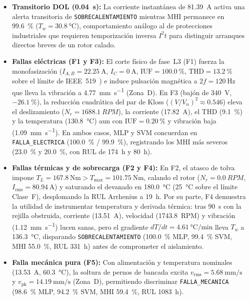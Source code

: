 \begin{itemize}\setlength{\itemsep}{2pt}\setlength{\topsep}{2pt}
\item \textbf{Transitorio DOL (\qty{0.04}{\second}):} La corriente instantánea de \qty{81.39}{\ampere} activa una alerta transitoria de \texttt{SOBRECALENTAMIENTO} mientras MHI permanece en \qty{99.6}{\percent} ($T_w=\qty{30.8}{\celsius}$), comportamiento análogo al de protecciones industriales que requieren temporización inversa $I^2t$ para distinguir arranques directos breves de un rotor calado.
\item \textbf{Fallas eléctricas (F1 y F3):} El corte físico de fase~L3 (F1) fuerza la monofasización ($I_{A,B}=\qty{22.25}{\ampere}$, $I_C=\qty{0}{\ampere}$, $\text{IUF}=\qty{100.0}{\percent}$, $\text{THD}=\qty{13.2}{\percent}$ sobre el límite de IEEE~519~\cite{IEEE519}) e induce pulsación magnética a $2f=\qty{120}{\hertz}$ que lleva la vibración a \qty{4.77}{\milli\meter\per\second} (Zona~D). En F3 (bajón de \qty{340}{\volt}, $-\qty{26.1}{\percent}$), la reducción cuadrática del par de Kloss ($(V/V_n)^2 \approx 0.546$) eleva el deslizamiento ($N_r=\qty{1688.1}{RPM}$), la corriente (\qty{17.82}{\ampere}), el THD (\qty{9.1}{\percent}) y la temperatura (\qty{130.8}{\celsius}) aun con $\text{IUF}=\qty{0.20}{\percent}$ y vibración baja (\qty{1.09}{\milli\meter\per\second}). En ambos casos, MLP y SVM concuerdan en \texttt{FALLA\_ELECTRICA} (\qty{100.0}{\percent} / \qty{99.9}{\percent}), registrando los MHI más severos (\qty{23.0}{\percent} y \qty{20.0}{\percent}, con RUL de \qty{174}{\hour} y \qty{80}{\hour}).
\item \textbf{Fallas térmicas y de sobrecarga (F2 y F4):} En F2, el atasco de tolva impone $T_L=\qty{167.8}{\newton\meter} > T_{\max}=\qty{101.75}{\newton\meter}$, calando el rotor ($N_r=\qty{0.0}{RPM}$, $I_{\text{rms}}=\qty{80.94}{\ampere}$) y saturando el devanado en \qty{180.0}{\celsius} (\qty{25}{\celsius} sobre el límite Clase~F), desplomando la RUL Arrhenius a \qty{19}{\hour}. Por su parte, F4 demuestra la utilidad de instrumentar temperatura y derivada térmica: tras \qty{90}{\second} con la rejilla obstruida, corriente (\qty{13.51}{\ampere}), velocidad (\qty{1743.8}{RPM}) y vibración (\qty{1.12}{\milli\meter\per\second}) lucen sanas, pero el gradiente $dT/dt=\qty{4.61}{\celsius\per\minute}$ lleva $T_w$ a \qty{136.3}{\celsius}, disparando \texttt{SOBRECALENTAMIENTO} (\qty{100.0}{\percent} MLP, \qty{99.4}{\percent} SVM, MHI \qty{55.0}{\percent}, RUL \qty{331}{\hour}) antes de comprometer el aislamiento.
\item \textbf{Falla mecánica pura (F5):} Con alimentación y temperatura nominales (\qty{13.53}{\ampere}, \qty{60.3}{\celsius}), la soltura de pernos de bancada excita $v_{\text{rms}}=\qty{5.68}{\milli\meter\per\second}$ y $v_{\text{pk}}=\qty{14.19}{\milli\meter\per\second}$ (Zona~D), permitiendo discriminar \texttt{FALLA\_MECANICA} (\qty{98.6}{\percent} MLP, \qty{94.2}{\percent} SVM, MHI \qty{59.4}{\percent}, RUL \qty{1083}{\hour}).
\end{itemize}

